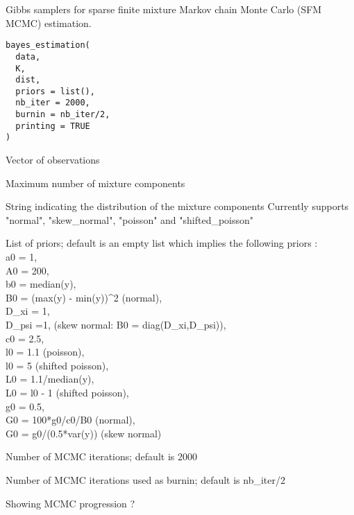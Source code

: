 \documentclass[a4paper]{book}
\begin{document}
%
\begin{Description}\relax
Gibbs samplers for sparse finite mixture Markov chain Monte Carlo (SFM MCMC) estimation.
\end{Description}
%
\begin{Usage}
\begin{verbatim}
bayes_estimation(
  data,
  K,
  dist,
  priors = list(),
  nb_iter = 2000,
  burnin = nb_iter/2,
  printing = TRUE
)
\end{verbatim}
\end{Usage}
%
\begin{Arguments}
\begin{ldescription}
\item[\code{data}] Vector of observations

\item[\code{K}] Maximum number of mixture components

\item[\code{dist}] String indicating the distribution of the mixture components
Currently supports "normal", "skew\_normal", "poisson" and "shifted\_poisson"

\item[\code{priors}] List of priors; default is an empty list which implies the following priors :\\{}
a0 = 1,\\{} A0 = 200,\\{} b0 = median(y),\\{} B0 = (max(y) - min(y))\textasciicircum{}2 (normal),\\{}
D\_xi = 1,\\{} D\_psi =1, (skew normal: B0 = diag(D\_xi,D\_psi)), \\{} c0 = 2.5,\\{}
l0 = 1.1 (poisson),\\{} l0 = 5 (shifted poisson),\\{} L0 = 1.1/median(y),\\{} L0 = l0 - 1 (shifted poisson),\\{}
g0 = 0.5,\\{} G0 = 100*g0/c0/B0 (normal),\\{} 
G0 = g0/(0.5*var(y)) (skew normal)

\item[\code{nb\_iter}] Number of MCMC iterations; default is 2000

\item[\code{burnin}] Number of MCMC iterations used as burnin; default is nb\_iter/2

\item[\code{printing}] Showing MCMC progression ?
\end{ldescription}
\end{Arguments}
\end{document}
